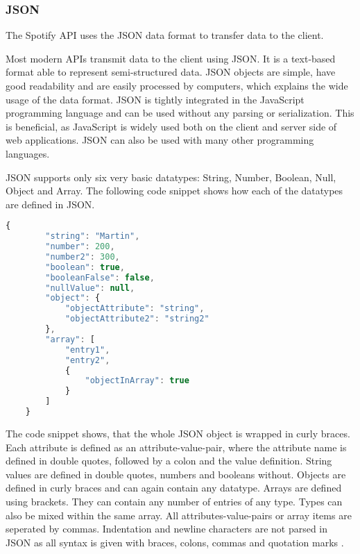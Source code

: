 

\subsubsection{JSON}

The Spotify API uses the \ac{JSON} data format to transfer data to the client\cite{SpotifyWebAPI}.

Most modern APIs transmit data to the client using \ac{JSON}.
It is a text-based format able to represent semi-structured data. \cite{MozillaJSON}
JSON objects are simple, have good readability and are easily processed by computers,
which explains the wide usage of the data format\cite{OracleJSON}.
JSON is tightly integrated in the JavaScript programming language and can be used without any parsing or serialization.\cite{OracleJSON}
This is beneficial, as JavaScript is widely used both on the client and server side of web applications. 
JSON can also be used with many other programming languages. \cite{JsonOrgIntroduction}

JSON supports only six very basic datatypes: String, Number, Boolean, Null, Object and Array.\cite{OracleJSON}
The following code snippet shows how each of the datatypes are defined in JSON.

\begin{lstlisting}[language=JavaScript]
    {
        "string": "Martin",
        "number": 200,
        "number2": 300,
        "boolean": true,
        "booleanFalse": false,
        "nullValue": null,
        "object": {
            "objectAttribute": "string",
            "objectAttribute2": "string2"
        },
        "array": [
            "entry1",
            "entry2",
            {
                "objectInArray": true
            }
        ]
    }
\end{lstlisting}

The code snippet shows, that the whole JSON object is wrapped in curly braces.
Each attribute is defined as an attribute-value-pair, where the attribute name is defined in 
double quotes, followed by a colon and the value definition. String values are defined in 
double quotes, numbers and booleans without. Objects are defined in curly braces and can
again contain any datatype.
Arrays are defined using brackets. They can contain any number of entries of any type.
Types can also be mixed within the same array.
All attributes-value-pairs or array items are seperated by commas.
Indentation and newline characters are not parsed in JSON as all syntax is given with braces,
colons, commas and quotation marks \cite{JsonOrgIntroduction}.

